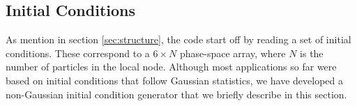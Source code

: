 \subsection{Initial Conditions}
\label{subsec:init}

As mention in section \ref{sec:structure}, the code start off by reading a set of initial conditions.
These correspond to a  $6 \times N$ phase-space array, where $N$ is the number of particles in the
local node. Although most applications so far were based on initial conditions that follow Gaussian statistics,
we have developed a non-Gaussian initial condition generator that we briefly describe in this section. 

